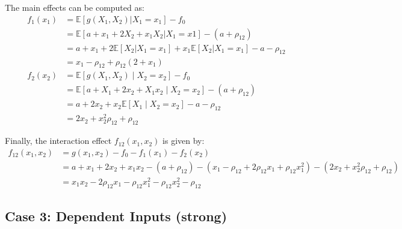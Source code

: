 The main effects can be computed as:
\begin{align*}
f_1(x_1) 
&= \mathbb{E}[g(X_1, X_2) | X_1 = x_1] - f_0 \\
&= \mathbb{E}[a + x_1 + 2X_2 + x_1 X_2 | X_1 = x1] - (a + \rho_{12}) \\
&= a + x_1 + 2\mathbb{E}[X_2 | X_1 = x_1] + x_1 \mathbb{E}[X_2 | X_1 = x_1] - a - \rho_{12} \\
&= x_1 - \rho_{12} + \rho_{12}(2 + x_1) \\
f_2(x_2) 
&= \mathbb{E}[g(X_1, X_2) \mid X_2 = x_2] - f_0 \\
&= \mathbb{E}[a + X_1 + 2x_2 + X_1 x_2 \mid X_2 = x_2] - (a + \rho_{12}) \\
&= a + 2x_2 + x_2 \mathbb{E}[X_1 \mid X_2 = x_2] - a - \rho_{12} \\
&= 2x_2 + x_2^2\rho_{12} + \rho_{12}
\end{align*}

Finally, the interaction effect \( f_{12}(x_1, x_2) \) is given by:
\begin{align*}
f_{12}(x_1, x_2) 
&= g(x_1, x_2) - f_0 - f_1(x_1) - f_2(x_2) \\
&= a + x_1 + 2x_2 + x_1 x_2 - (a + \rho_{12}) - (x_1 - \rho_{12} + 2\rho_{12} x_1 + \rho_{12} x_1^2) - (2x_2 + x_2^2 \rho_{12} + \rho_{12}) \\
&= x_1 x_2 - 2\rho_{12} x_1 - \rho_{12} x_1^2 - \rho_{12} x_2^2 - \rho_{12}
\end{align*}

\subsection*{Case 3: Dependent Inputs (strong)}